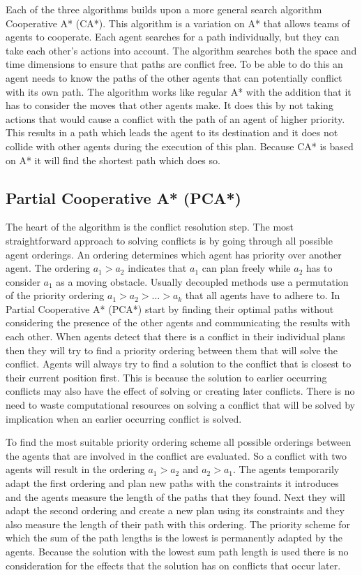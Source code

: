 Each of the three algorithms builds upon a more general search algorithm
Cooperative A* (CA*). This algorithm is a variation on A* \cite{hart1968} that
allows teams of agents to cooperate. Each agent searches for a path
individually, but they can take each other's actions into account. The
algorithm searches both the space and time dimensions to ensure that paths are
conflict free. To be able to do this an agent needs to know the paths of the
other agents that can potentially conflict with its own path. The algorithm
works like regular A* with the addition that it has to consider the moves that
other agents make. It does this by not taking actions that would cause a
conflict
with the path of an agent of higher priority. This results in a path which
leads the agent to its destination and it does not collide with other agents
during the execution of this plan. Because CA* is based on A* it will find the
shortest path which does so.

\subsection{Partial Cooperative A* (PCA*)}
The heart of the algorithm is the conflict resolution step. The most
straightforward approach to solving conflicts is by going through all possible
agent orderings. An ordering determines which agent has priority over another
agent. The ordering $a_1 > a_2$ indicates that $a_1$ can plan freely while
$a_2$ has to consider $a_1$ as a moving obstacle. Usually decoupled methods use
a permutation of the priority ordering $a_1 > a_2 > \ldots > a_k$ that all
agents have to adhere to. In Partial Cooperative A* (PCA*) start by finding
their optimal paths without considering the presence of the other agents and
communicating the results with each other. When agents detect that there is a
conflict in their individual plans then they will try to find a priority
ordering between them that will solve the conflict. Agents will always try to
find a solution to the conflict that is closest to their current position
first. This is because the solution to earlier occurring conflicts may also
have the effect of solving or creating later conflicts. There is no need to
waste computational resources on solving a conflict that will be solved by
implication when an earlier occurring conflict is solved.

To find the most suitable priority ordering scheme all possible orderings
between the agents that are involved in the conflict are evaluated. So a
conflict with two agents will result in the ordering $a_1 > a_2$ and $a_2 >
a_1$. The agents temporarily adapt the first ordering and plan new paths with
the constraints it introduces and the agents measure the length of the paths
that they found. Next they will adapt the second ordering and create a new plan
using its constraints and they also measure the length of their path with this
ordering. The priority scheme for which the sum of the path lengths is the
lowest is permanently adapted by the agents. Because the solution with the
lowest sum path length is used there is no consideration for the effects that
the solution has on conflicts that occur later.

